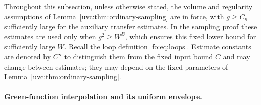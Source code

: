 \documentclass[11pt]{article}
\numberwithin{equation}{section}
\theoremstyle{remark}
\begin{document}
Throughout this subsection, unless otherwise stated, the volume and
regularity assumptions of Lemma~\ref{uvc:thm:ordinary-sampling}
are in force, with $g\ge C_\kappa$ sufficiently large for the auxiliary
transfer estimates. In the sampling proof these estimates are used only
when $g^2\ge W^B$, which ensures this fixed lower bound for sufficiently
large $W$.
Recall the loop definition \eqref{fo:eq:loops}.
Estimate constants are denoted by $C''$ to distinguish them from the
fixed input bound $C$ and may change between estimates; they may depend
on the fixed parameters of Lemma~\ref{uvc:thm:ordinary-sampling}.

\paragraph{Green-function interpolation and its uniform envelope.}
\end{document}

